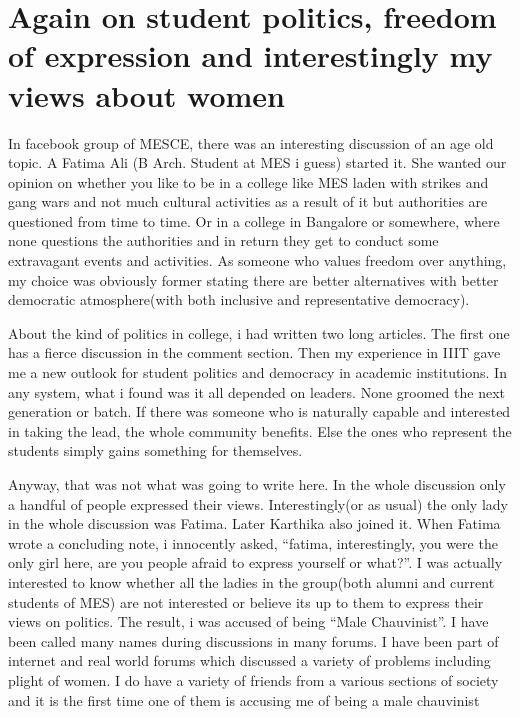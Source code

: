 \section*{Again on student politics, freedom of expression and interestingly my views about women}
\vskip 2pt

In facebook group of MESCE, there was an interesting discussion of an age old topic. A Fatima Ali
(B Arch. Student at MES i guess) started it. She wanted our opinion on whether you like to be in a 
college like MES laden with strikes and gang wars and not much cultural activities as a result of 
it but authorities are questioned from time to time. Or in a college in Bangalore or somewhere, 
where none questions the authorities and in return they get to conduct some extravagant events and 
activities. As someone who values freedom over anything, my choice was obviously former stating there are 
better alternatives with better democratic atmosphere(with both inclusive and representative democracy).

About the kind of politics in college, i had written two long articles. The first one has a fierce discussion 
in the comment section. Then my experience in IIIT gave me a new outlook for student politics and democracy in 
academic institutions. In any system, what i found was it all depended on leaders. None groomed the next generation 
or batch. If there was someone who is naturally capable and interested in taking the lead, the whole community benefits. 
Else the ones who represent the students simply gains something for themselves.

Anyway, that was not what was going to write here. In the whole discussion only a handful of people expressed their views. 
Interestingly(or as usual) the only lady in the whole discussion was Fatima. Later Karthika also joined it. 
When Fatima wrote a concluding note, i innocently asked, ``fatima, interestingly, you were the only girl here, 
are you people afraid to express yourself or what?''. I was actually interested to know whether all the 
ladies in the group(both alumni and current students of MES) are not interested or believe its up to them 
to express their views on politics. The result, i was accused of being ``Male Chauvinist''. 
I have been called many names during discussions in many forums. I have been part of internet and real 
world forums which discussed a variety of problems including plight of women. 
I do have a variety of friends from a various sections of society and it is the first time one of 
them is accusing me of being a male chauvinist

